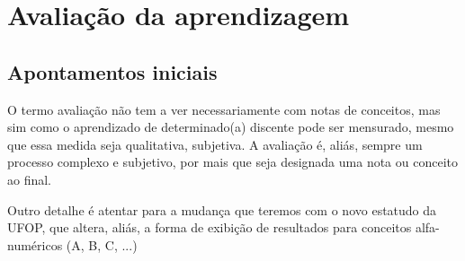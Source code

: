 \chapter{Avaliação da aprendizagem} 
\label{cap:06} 
%
\section{Apontamentos iniciais}
O termo avaliação não tem a ver necessariamente com notas de conceitos, mas sim como o aprendizado de determinado(a) discente pode ser mensurado, mesmo que essa medida seja qualitativa, subjetiva. A avaliação é, aliás, sempre um processo complexo e subjetivo, por mais que seja designada uma nota ou conceito ao final. 

Outro detalhe é atentar para a mudança que teremos com o novo estatudo da UFOP, que altera, aliás, a forma de exibição de resultados para conceitos alfa-numéricos (A, B, C, ...)